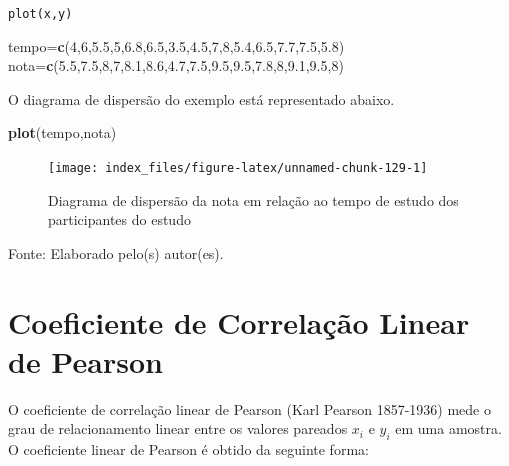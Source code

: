 \documentclass[12pt,portuguese,oneside]{book}
\newenvironment{Shaded}{\begin{snugshade}}{\end{snugshade}}
\newcommand{\KeywordTok}[1]{\textcolor[rgb]{0.13,0.29,0.53}{\textbf{#1}}}
\newcommand{\DecValTok}[1]{\textcolor[rgb]{0.00,0.00,0.81}{#1}}
\newcommand{\FloatTok}[1]{\textcolor[rgb]{0.00,0.00,0.81}{#1}}
\newcommand{\NormalTok}[1]{#1}
\begin{document}
\texttt{plot(x,y)}

\begin{Shaded}
\begin{Highlighting}[]
\NormalTok{tempo=}\KeywordTok{c}\NormalTok{(}\DecValTok{4}\NormalTok{,}\DecValTok{6}\NormalTok{,}\FloatTok{5.5}\NormalTok{,}\DecValTok{5}\NormalTok{,}\FloatTok{6.8}\NormalTok{,}\FloatTok{6.5}\NormalTok{,}\FloatTok{3.5}\NormalTok{,}\FloatTok{4.5}\NormalTok{,}\DecValTok{7}\NormalTok{,}\DecValTok{8}\NormalTok{,}\FloatTok{5.4}\NormalTok{,}\FloatTok{6.5}\NormalTok{,}\FloatTok{7.7}\NormalTok{,}\FloatTok{7.5}\NormalTok{,}\FloatTok{5.8}\NormalTok{)}
\NormalTok{nota=}\KeywordTok{c}\NormalTok{(}\FloatTok{5.5}\NormalTok{,}\FloatTok{7.5}\NormalTok{,}\DecValTok{8}\NormalTok{,}\DecValTok{7}\NormalTok{,}\FloatTok{8.1}\NormalTok{,}\FloatTok{8.6}\NormalTok{,}\FloatTok{4.7}\NormalTok{,}\FloatTok{7.5}\NormalTok{,}\FloatTok{9.5}\NormalTok{,}\FloatTok{9.5}\NormalTok{,}\FloatTok{7.8}\NormalTok{,}\DecValTok{8}\NormalTok{,}\FloatTok{9.1}\NormalTok{,}\FloatTok{9.5}\NormalTok{,}\DecValTok{8}\NormalTok{)}
\end{Highlighting}
\end{Shaded}

O diagrama de dispersão do exemplo está representado abaixo.

\begin{Shaded}
\begin{Highlighting}[]
\KeywordTok{plot}\NormalTok{(tempo,nota)}
\end{Highlighting}
\end{Shaded}

\begin{figure}[H]

{\centering \texttt{[image: index\_files/figure-latex/unnamed-chunk-129-1]} 

}

\caption{Diagrama de dispersão da nota em relação ao tempo de estudo dos participantes do estudo}\label{fig:unnamed-chunk-129}
\end{figure}

Fonte: Elaborado pelo(s) autor(es).

\section{Coeficiente de Correlação Linear de
Pearson}\label{coeficiente-de-correlacao-linear-de-pearson}

O coeficiente de correlação linear de Pearson (Karl Pearson 1857-1936)
mede o grau de relacionamento linear entre os valores pareados \(x_i\) e
\(y_i\) em uma amostra. O coeficiente linear de Pearson é obtido da
seguinte forma:
\end{document}
